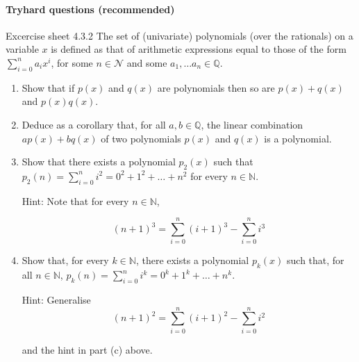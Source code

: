 \documentclass{exam}
\begin{document}
\paragraph{Tryhard questions (recommended)}
\begin{questions}

\question Excercise sheet 4.3.2 The set of (univariate) polynomials (over the rationals) on a variable $x$ is defined as that of arithmetic
expressions equal to those of the form $\sum_{i=0}^n a_ix^i$, for some $n \in \mathcal{N}$ and some $a_1, \dots a_n \in \mathds{Q}$.
\begin{enumerate}[label=(\alph*)]
\item Show that if $p(x)$ and $q(x)$ are polynomials then so are $p(x) + q(x)$ and $p(x)q(x)$.

\item Deduce as a corollary that, for all $a, b \in \mathds{Q}$, the linear combination $ap(x)+bq(x)$ of two polynomials
$p(x)$ and $q(x)$ is a polynomial.

\item Show that there exists a polynomial $p_2(x)$ such that $p_2(n) = \sum_{i=0}^n i^2 = 0^2 + 1^2 + \dots + n^2$ for every $n \in \mathds{N}$.

Hint: Note that for every $n \in \mathds{N}$,

$$(n+1)^3 = \sum_{i=0}^n(i+1)^3 - \sum_{i=0}^n i^3$$

\item Show that, for every $k \in \mathds{N}$, there exists a polynomial $p_k(x)$ such that, for all $n \in \mathds{N}$, $p_k(n) = \sum_{i=0}^n i^k = 0^k + 1^k + \dots + n^k$.

Hint: Generalise $$(n + 1)^2 = \sum_{i=0}^n (i+1)^2 - \sum_{i=0}^n i^2$$

and the hint in part (c) above.
\end{enumerate} 

\end{questions}
\end{document}
